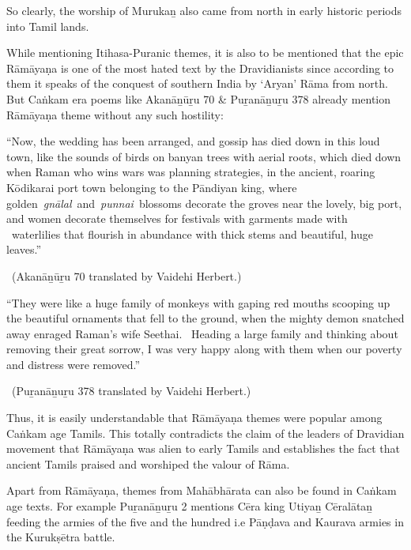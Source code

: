 So clearly, the worship of Murukaṉ also came from north in early historic periods into Tamil lands.

While mentioning Itihasa-Puranic themes, it is also to be mentioned that the epic Rāmāyaṇa is one of the most hated text by the Dravidianists since according to them it speaks of the conquest of southern India by ‘Aryan’ Rāma from north. But Caṅkam era poems like Akanāṉūṟu 70 \& Puṟanāṉuṟu 378 already mention Rāmāyaṇa theme without any such hostility:

\begin{myquote}
“Now, the wedding has been arranged, and gossip has died down in this loud town, like the sounds of birds on banyan trees with aerial roots, which died down when Raman who wins wars was planning strategies, in the ancient, roaring Kōdikarai port town belonging to the Pāndiyan king, where golden \textit{gnālal} and \textit{punnai} blossoms decorate the groves near the lovely, big port, and women decorate themselves for festivals with garments made with  waterlilies that flourish in abundance with thick stems and beautiful, huge leaves.”

~\hfill (Akanāṉūṟu 70 translated by Vaidehi Herbert.)
\end{myquote}

\begin{myquote}
“They were like a huge family of monkeys with gaping red mouths scooping up the beautiful ornaments that fell to the ground, when the mighty demon snatched away enraged Raman’s wife Seethai.  Heading a large family and thinking about removing their great sorrow, I was very happy along with them when our poverty and distress were removed.”

~\hfill (Puṟanāṉuṟu 378 translated by Vaidehi Herbert.)
\end{myquote}

Thus, it is easily understandable that Rāmāyaṇa themes were popular among Caṅkam age Tamils. This totally contradicts the claim of the leaders of Dravidian movement that Rāmāyaṇa was alien to early Tamils and establishes the fact that ancient Tamils praised and worshiped the valour of Rāma.

Apart from Rāmāyaṇa, themes from Mahābhārata can also be found in Caṅkam age texts. For example Puṟanāṉuṟu 2 mentions Cēra king Utiyaṉ Cēralātaṉ feeding the armies of the five and the hundred i.e Pāṇḍava and Kaurava armies in the Kurukṣētra battle.

